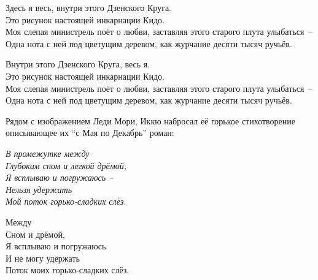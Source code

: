 \begin{ver}[3]
  \begin{verses}
    Здесь я весь, внутри этого Дзенского Круга.\\ 
    Это рисунок настоящей инкарнации Кидо.\\
    Моя слепая министрель поёт о любви, заставляя этого старого
    плута улыбаться~--\\
    Одна нота с ней под цветущим деревом, как журчание десяти тысяч
    ручьёв.  
  \end{verses}
\end{ver}

\begin{ver}[4]
  \begin{verses}
    Внутри этого Дзенского Круга, весь я.\\ 
    Это рисунок настоящей инкарнации Кидо.\\
    Моя слепая министрель поёт о любви, заставляя этого старого
    плута улыбаться~--\\
    Одна нота с ней под цветущим деревом, как журчание десяти тысяч
    ручьёв.  
  \end{verses}
\end{ver}

\begin{ver}[1]
    Рядом с изображением Леди Мори, Иккю набросал её
    горькое стихотворение
    описывающее их ``с Мая по Декабрь'' роман:
\end{ver}

\begin{ver}[1]
  \begin{verses}\it
    В промежутке между\\
    Глубоким сном и легкой дрёмой,\\
    Я всплываю и погружаюсь --\\
    Нельзя удержать\\
    Мой поток горько-сладких слёз.
  \end{verses}
\end{ver}

\begin{ver}[2]
  \begin{verses}
    Между\\
    Сном и дрёмой,\\
    Я всплываю и погружаюсь\\
    И не могу удержать\\
    Поток моих горько-сладких слёз.
  \end{verses}
\end{ver}
 
